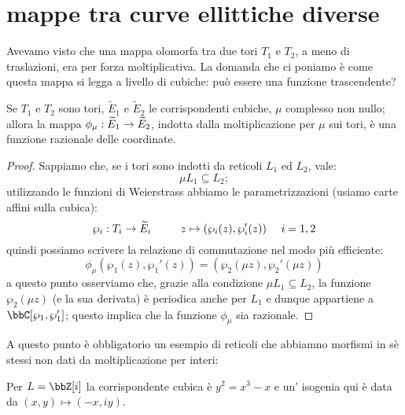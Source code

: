 \section{mappe tra curve ellittiche diverse}
Avevamo visto che una mappa olomorfa tra due tori $T_1$ e $T_2$, a meno di traslazioni, era per forza moltiplicativa. La domanda che ci poniamo è come questa mappa si legga a livello di cubiche: può essere una funzione trascendente?
\begin{proposizione}
Se $T_1$ e $T_2$ sono tori, $\widetilde{E}_1$ e $\widetilde{E}_2$ le corrispondenti cubiche, $\mu$ complesso non nullo; allora la mappa $\phi_\mu:\widetilde{E}_1\rightarrow\widetilde{E}_2$, indotta dalla moltiplicazione per $\mu$ sui tori, è una funzione razionale delle coordinate.
\end{proposizione}
\begin{proof}
Sappiamo che, se i tori sono indotti da reticoli $L_1$ ed $L_2$, vale:
$$
\mu L_1\subseteq L_2;
$$
utilizzando le funzioni di Weierstrass abbiamo le parametrizzazioni (usiamo carte affini sulla cubica):
$$
\wp_i:T_i\rightarrow \widetilde{E}_i \qquad \ \ z \mapsto (\wp_i(z),\wp_i'(z))\ \ \ \ i=1,2
$$
quindi possiamo scrivere la relazione di commutazione nel modo più efficiente:
$$
\phi_\mu(\wp_1(z),\wp_1'(z))=(\wp_2(\mu z),\wp_2'(\mu z))
$$
a questo punto osserviamo che, grazie alla condizione $\mu L_1\subseteq L_2$, la funzione $\wp_2(\mu z)$ (e la sua derivata) è periodica anche per $L_1$ e dunque appartiene a $\bbC[\wp_1,\wp_1']$; questo implica che la funzione $\phi_\mu$ sia razionale.
\end{proof}
A questo punto è obbligatorio un esempio di reticoli che abbiamno morfismi in sè stessi non dati da moltiplicazione per interi:
\begin{fatto}
Per $L=\bbZ[i]$ la corrispondente cubica è $y^2=x^3-x$ e un' isogenia qui è data da $(x,y)\mapsto (-x,iy)$.
\end{fatto}
